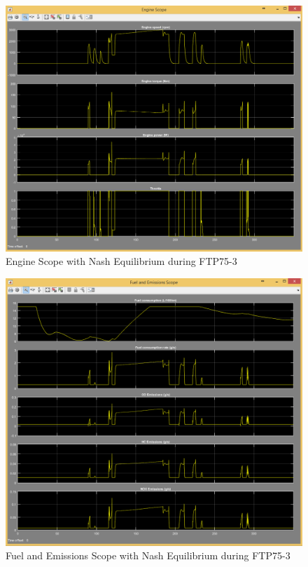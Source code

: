 \begin{figure}[h]
\centering
\includegraphics[scale=0.37]{figures/NashEquilibrium/FTP75-3/engine15Juni}
\caption{Engine Scope with Nash Equilibrium during FTP75-3}
\label{fig:ene3}
\end{figure}

\begin{figure}[h]
\centering
\includegraphics[scale=0.4]{figures/NashEquilibrium/FTP75-3/fuelEmissions15Juni}
\caption{Fuel and Emissions Scope with Nash Equilibrium during FTP75-3}
\label{fig:fene3}
\end{figure}

